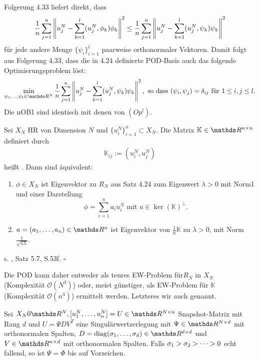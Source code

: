 Folgerung 4.33 liefert direkt, dass
\[
\frac{1}{n} \sum_{j=1}^n \left\Vert u_j^N - \sum_{k=1}^{l} (u_j^N,\phi_k)\phi_k \right\Vert^2 \le \frac{1}{n} \sum_{j=1}^n \left\Vert u_j^N - \sum_{k=1}^{l} (u_j^N,\psi_k)\psi_k \right\Vert^2
\]
für jede andere Menge $\{\psi_i\}_{i=1}^l$ paarweise orthonormaler Vektoren.
Damit folgt aus Folgerung 4.33, dass die in 4.24 definierte POD-Basis auch das folgende Optimierungsproblem löst:
\[
\min\limits_{\psi_1\dt{,}\psi_l\in\R^N} \frac{1}{n} \sum_{j=1}^n \norm{u_j^N - \sum_{k=1}^{l} (u_j^N,\psi_k)\psi_k }^2, \text{ so dass } (\psi_i,\psi_j) = \delta_{ij} \text{ für } 1\le i,j \le l.
\]
Die nOB1 sind identisch mit denen von $(Op^l)$.

Sei $X_N$ HR von Dimension $N$ und $\{u_i^N\}_{i=1}^n\subset X_N$.
Die Matrix $\mathbb{K}\in \R^{n\times n}$ definiert durch
\begin{align}
\mathbb{K}_{ij} := (u_i^N,u_j^N)
\end{align}
heißt .
Dann sind äquivalent:
\begin{enumerate}[(1)]
	\item $\phi\in X_N$ ist Eigenvektor zu $R_N$ aus Satz 4.24 zum Eigenwert $\lambda>0$ mit Norm1 und einer Darstellung
	\[
	\phi = \sum_{i=1}^n a_i u_i^N \text{ mit } a\in \ker (\mathbb{K})^{\perp}.
	\]
	\item $a=(a_1\dt{,}a_n)\in \R^n$ ist Eigenvektor von $\frac{1}{n} \mathbb{K}$ zu $\lambda>0$, mit Norm $\frac{1}{\sqrt{n\lambda}}$.
\end{enumerate}

 s. \cite{Haa11}, Satz 5.7, S.53f.
\hfill $\square$

Die POD kann daher entweder als teures EW-Problem für$R_N$ in $X_N$ (Komplexität $\mathcal{O}(N^3)$) oder, meist günstiger, als EW-Problem für $\mathbb{K}$ (Komplexität $\mathcal{O}(n^3)$) ermittelt werden.
Letzteres wir auch  genannt.

Sei $X_N0\R^N, [u_1^N\dt{,}u_n^N] =U \in \R^{N\times n}$ Snapshot-Matrix mit Rang $d$ und $U=\Psi DV^T$ eine Singulärwertzerlegung mit $\Psi\in \R^{N\times d}$ mit orthonormalen Spalten, $D=\diag(\sigma_1\dt{,}\sigma_d)\in \R^{d\times d}$ und $V\in \R^{n\times d}$ mit orthonormalen Spalten.
Falls $\sigma_1>\sigma_2> \dots >0$ echt fallend, so ist $\Psi=\Phi$ bis auf Vorzeichen.\\

